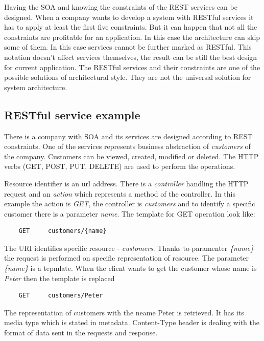 Having the SOA and knowing the constraints of the REST services can be designed. When a company wants to develop a system with RESTful services it has to apply at least the first five constraints. But it can happen that not all the constraints are profitable for an application. In this case the architecture can skip some of them. In this case services cannot be further marked as RESTful. This notation doesn't affect services themselves, the result can be still the best design for current application. The RESTful services and their constraints are one of the possible solutions of architectural style. They are not the universal solution for system architecture.

\subsection{RESTful service example}
There is a company with SOA and its services are designed according to REST constraints. One of the services represents business abstraction of \emph{customers} of the company. Customers can be viewed, created, modified or deleted. The HTTP verbs (GET, POST, PUT, DELETE) are used to perform the operations. 

Resource identifier is an \gls{url} address. There is a \emph{controller} handling the HTTP request and an \emph{action} which represents a method of the controller. In this example the action is \emph{GET}, the controller is \emph{customers} and to identify a specific customer there is a parameter \emph{name}. The template for GET operation look like:

\begin{lstlisting}
    GET     customers/{name} 
\end{lstlisting}


The URI identifies specific resource - \emph{customers}. Thanks to paramenter \emph{\{name\}} the request is performed on specific representation of resource. The parameter \emph{\{name\}} is a tepmlate. When the client wants to get the customer whose name is \emph{Peter} then the template is replaced

\begin{lstlisting}
    GET     customers/Peter 
\end{lstlisting}

The representation of customers with the neame Peter is retrieved. It has its media type which is stated in metadata. Content-Type header is dealing with the format of data sent in the requests and response.

